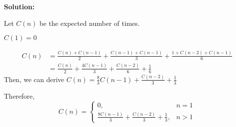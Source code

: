 \documentclass[11pt]{article} %
\begin{document}
\begin{enumerate}[(a)]
     \textbf{Solution:}

     Let $C(n)$ be the expected number of times. 

     $C(1)= 0$

     \begin{align*}
        C(n) &= \frac{C(n)+C(n-1)}{2}+\frac{C(n-1)+C(n-1)}{3}+\frac{1+C(n-2)+C(n-1)}{6}\\
            &= \frac{C(n)}{2}+\frac{4C(n-1)}{3}+\frac{C(n-2)}{6}+\frac{1}{6}
     \end{align*}
     Then, we can derive $C(n)= \frac{8}{3}C(n-1)+\frac{C(n-2)}{3}+\frac{1}{3}$

     Therefore,
     \begin{equation*}
        C(n) =  \begin{cases}
            0, &n = 1\\
            \frac{8C(n-1)}{3}+\frac{C(n-2)}{3}+\frac{1}{3}, & n>1
        \end{cases}
     \end{equation*}
\end{enumerate}
\end{document}

